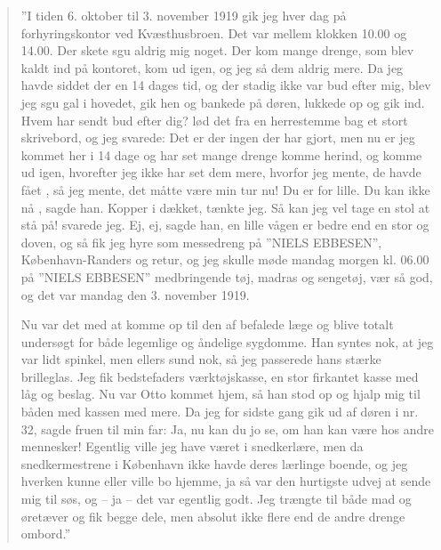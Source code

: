 \begin{quote}
''I tiden 6. oktober
    til 3. november 1919 gik jeg hver dag på 
    forhyringskontor ved Kvæsthusbroen. Det var mellem klokken 10.00 og
    14.00. Der skete sgu aldrig mig noget. Der kom mange drenge, som blev
    kaldt ind på kontoret, kom ud igen, og jeg så dem aldrig mere. Da jeg
    havde siddet der en 14 dages tid, og der stadig ikke var bud efter
    mig, blev jeg sgu gal i hovedet, gik hen og bankede på døren, lukkede
    op og gik ind. Hvem har sendt bud efter dig? lød det fra en
    herrestemme bag et stort skrivebord, og jeg svarede: Det er der ingen
    der har gjort, men nu er jeg kommet her i 14 dage og har set mange
    drenge komme herind, og komme ud igen, hvorefter jeg ikke har set dem
    mere, hvorfor jeg mente, de havde fået , så jeg mente, det måtte
    være min tur nu! Du er for lille. Du kan ikke nå ,
    sagde han. Kopper i dækket, tænkte jeg. Så kan jeg vel tage en stol
    at stå på! svarede jeg. Ej, ej, sagde han, en lille vågen er bedre
    end en stor og doven, og så fik jeg hyre som messedreng på ''NIELS
    EBBESEN'', København-Randers og retur, og jeg skulle møde mandag
    morgen kl. 06.00 på ''NIELS EBBESEN'' medbringende tøj, madras og
    sengetøj, vær så god, og det var mandag den 3. november 1919.

    Nu var det med at komme op til den af  befalede læge og blive
    totalt undersøgt for både legemlige og åndelige sygdomme. Han syntes
    nok, at jeg var lidt spinkel, men ellers sund nok, så jeg passerede hans
    stærke brilleglas. Jeg fik bedstefaders værktøjskasse, en stor firkantet
    kasse med låg og beslag. Nu var Otto kommet hjem, så han stod op og
    hjalp mig til båden med kassen med mere. Da jeg for sidste gang gik ud
    af døren i nr. 32, sagde fruen til min far: Ja, nu kan du jo se, om han
    kan være hos andre mennesker! Egentlig ville jeg have været i
    snedkerlære, men da snedkermestrene i København ikke havde deres
    lærlinge boende, og jeg hverken kunne eller ville bo hjemme, ja så var
    den hurtigste udvej at sende mig til søs, og -- ja -- det var egentlig
    godt. Jeg trængte til både mad og øretæver og fik begge dele, men
    absolut ikke flere end de andre drenge ombord.''
\end{quote}

